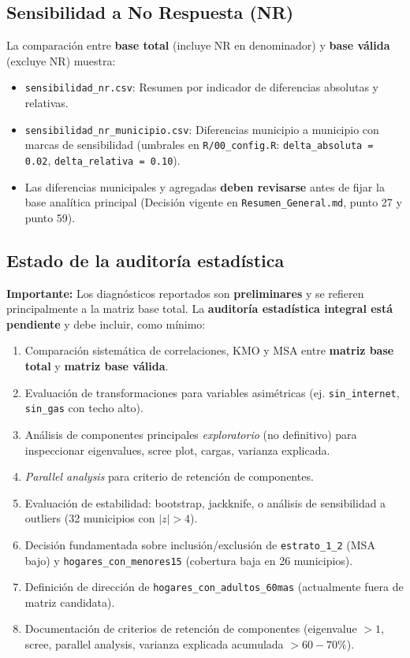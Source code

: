 \subsection{Sensibilidad a No Respuesta (NR)}
\label{sec:sensibilidad_nr_diag}

La comparación entre \textbf{base total} (incluye NR en denominador) y \textbf{base válida} (excluye NR) muestra:

\begin{itemize}
    \item \texttt{sensibilidad\_nr.csv}: Resumen por indicador de diferencias absolutas y relativas.
    \item \texttt{sensibilidad\_nr\_municipio.csv}: Diferencias municipio a municipio con marcas de sensibilidad (umbrales en \texttt{R/00\_config.R}: \texttt{delta\_absoluta = 0.02}, \texttt{delta\_relativa = 0.10}).
    \item Las diferencias municipales y agregadas \textbf{deben revisarse} antes de fijar la base analítica principal (Decisión vigente en \texttt{Resumen\_General.md}, punto 27 y punto 59).
\end{itemize}

\subsection{Estado de la auditoría estadística}
\label{sec:auditoria_pendiente}

\textbf{Importante:} Los diagnósticos reportados son \textbf{preliminares} y se refieren principalmente a la matriz base total. La \textbf{auditoría estadística integral está pendiente} y debe incluir, como mínimo:

\begin{enumerate}
    \item Comparación sistemática de correlaciones, KMO y MSA entre \textbf{matriz base total} y \textbf{matriz base válida}.
    \item Evaluación de transformaciones para variables asimétricas (ej. \texttt{sin\_internet}, \texttt{sin\_gas} con techo alto).
    \item Análisis de componentes principales \textit{exploratorio} (no definitivo) para inspeccionar eigenvalues, scree plot, cargas, varianza explicada.
    \item \textit{Parallel analysis} para criterio de retención de componentes.
    \item Evaluación de estabilidad: bootstrap, jackknife, o análisis de sensibilidad a outliers (32 municipios con $|z|>4$).
    \item Decisión fundamentada sobre inclusión/exclusión de \texttt{estrato\_1\_2} (MSA bajo) y \texttt{hogares\_con\_menores15} (cobertura baja en 26 municipios).
    \item Definición de dirección de \texttt{hogares\_con\_adultos\_60mas} (actualmente fuera de matriz candidata).
    \item Documentación de criterios de retención de componentes (eigenvalue $>1$, scree, parallel analysis, varianza explicada acumulada $> 60-70\%$).
\end{enumerate}

